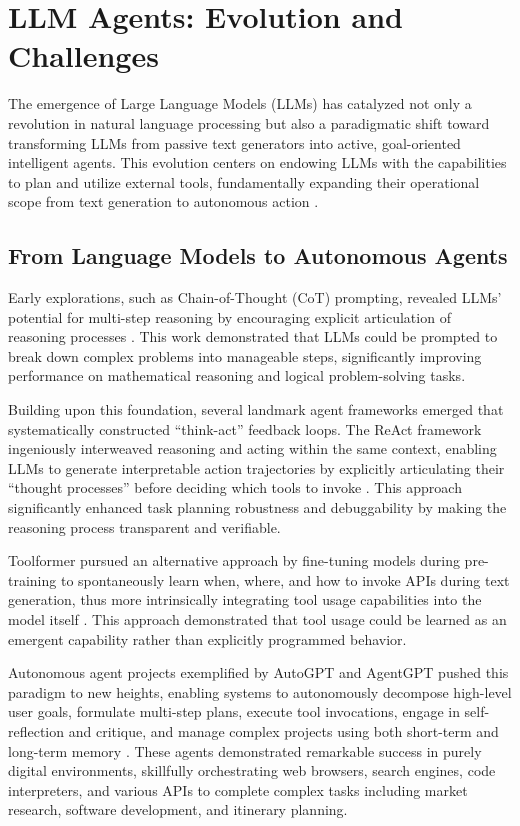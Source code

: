 \section{LLM Agents: Evolution and Challenges}

The emergence of Large Language Models (LLMs) has catalyzed not only a revolution in natural language processing but also a paradigmatic shift toward transforming LLMs from passive text generators into active, goal-oriented intelligent agents. This evolution centers on endowing LLMs with the capabilities to plan and utilize external tools, fundamentally expanding their operational scope from text generation to autonomous action \cite{mialon2023augmented}.

\subsection{From Language Models to Autonomous Agents}

Early explorations, such as Chain-of-Thought (CoT) prompting, revealed LLMs' potential for multi-step reasoning by encouraging explicit articulation of reasoning processes \cite{wei2022chain}. This work demonstrated that LLMs could be prompted to break down complex problems into manageable steps, significantly improving performance on mathematical reasoning and logical problem-solving tasks.

Building upon this foundation, several landmark agent frameworks emerged that systematically constructed ``think-act'' feedback loops. The ReAct framework ingeniously interweaved reasoning and acting within the same context, enabling LLMs to generate interpretable action trajectories by explicitly articulating their ``thought processes'' before deciding which tools to invoke \cite{yao2022react}. This approach significantly enhanced task planning robustness and debuggability by making the reasoning process transparent and verifiable.

Toolformer pursued an alternative approach by fine-tuning models during pre-training to spontaneously learn when, where, and how to invoke APIs during text generation, thus more intrinsically integrating tool usage capabilities into the model itself \cite{schick2023toolformer}. This approach demonstrated that tool usage could be learned as an emergent capability rather than explicitly programmed behavior.

Autonomous agent projects exemplified by AutoGPT and AgentGPT pushed this paradigm to new heights, enabling systems to autonomously decompose high-level user goals, formulate multi-step plans, execute tool invocations, engage in self-reflection and critique, and manage complex projects using both short-term and long-term memory \cite{richards2023autogpt}. These agents demonstrated remarkable success in purely digital environments, skillfully orchestrating web browsers, search engines, code interpreters, and various APIs to complete complex tasks including market research, software development, and itinerary planning.

